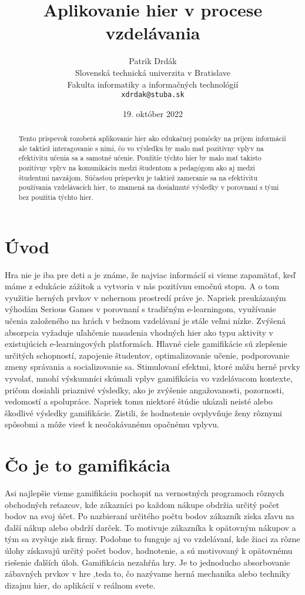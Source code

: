\documentclass[10pt,twoside,slovak,a4paper]{article}
\title{Aplikovanie hier v procese vzdelávania
} %
\author{Patrik Drdák\\[2pt]
	{\small Slovenská technická univerzita v Bratislave}\\
	{\small Fakulta informatiky a informačných technológií}\\
	{\small \texttt{xdrdak@stuba.sk}}
	}
\date{\small 19. október 2022} %
\begin{document}
\maketitle

\begin{abstract}
Tento príspevok rozoberá aplikovanie hier
ako edukačnej pomôcky na príjem informácií ale taktiež interagovanie s nimi,
čo vo výsledku by malo mať pozitívny vplyv na efektivitu učenia sa a samotné
učenie. Použitie týchto hier by malo mať takisto pozitívny vplyv na komunikáciu medzi študentom a pedagógom ako aj medzi študentmi navzájom. Súčasťou príspevku je taktiež zameranie sa na efektivitu používania vzdelávacích hier, to znamená na dosiahnuté výsledky v porovnaní s tými bez použitia týchto hier.

\end{abstract}



\section{Úvod}

Hra nie je iba pre deti a je známe, že najviac informácií si vieme zapamätať, keď máme z edukácie zážitok a vytvoria v nás pozitívnu emočnú stopu. A o tom využitie herných prvkov v nehernom prostredí práve je. Napriek preukázaným výhodám Serious Games v porovnaní s tradičným e-learningom, využívanie učenia založeného na hrách
v bežnom vzdelávaní je stále veľmi nízke. Zvýšená absorpcia
vyžaduje uľahčenie nasadenia vhodných hier ako typu aktivity
v existujúcich e-learningových platformách. Hlavné ciele gamifikácie sú zlepšenie určitých schopností, zapojenie študentov, optimalizovanie učenie, podporovanie zmeny správania a socializovanie sa. Stimulovaní efektmi, ktoré môžu herné prvky vyvolať, mnohí výskumníci skúmali vplyv gamifikácia vo vzdelávacom kontexte, pričom dosiahli priaznivé výsledky, ako je zvýšenie angažovanosti, pozornosti, vedomostí a spolupráce. Napriek tomu niektoré štúdie ukázali neisté alebo škodlivé výsledky gamifikácie. Zistili, že hodnotenie ovplyvňuje ženy rôznymi spôsobmi a môže viesť k neočakávanému opačnému vplyvu.

\section{Čo je to gamifikácia}
Asi najlepšie vieme gamifikáciu pochopiť na vernostných programoch rôznych obchodných reťazcov, kde zákazníci po každom nákupe obdržia určitý počet bodov na svoj účet.\cite{jakub} Po nazbieraní určitého počtu bodov zákazník získa zľavu na ďalší nákup alebo obdrží darček. To motivuje zákazníka k opätovným nákupov a tým sa zvyšuje zisk firmy. Podobne to funguje aj vo vzdelávaní, kde žiaci za rôzne úlohy získavajú určitý počet bodov, hodnotenie, a sú motivovaný k opätovnému riešenie ďalších úloh.  Gamifikácia nezahŕňa hry. Je to jednoducho absorbovanie zábavných prvkov v hre ,teda to, čo nazývame herná mechanika  alebo techniky dizajnu hier, do aplikácií v reálnom svete.
\end{document}

